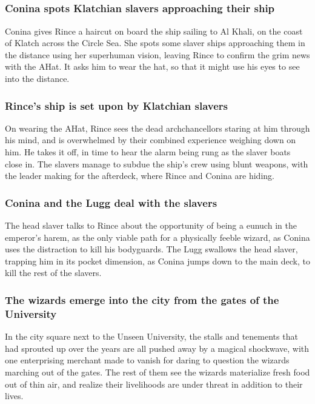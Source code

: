 \subsection{}
\subsubsection{\Gls{Conina} spots Klatchian slavers approaching their ship}
\Gls{Conina} gives \Gls{Rince} a haircut on board the ship sailing to Al Khali, on the coast of
Klatch across the Circle Sea. She spots some slaver ships approaching them in the distance using
her superhuman vision, leaving \Gls{Rince} to confirm the grim news with the \Gls{AHat}. It asks
him to wear the hat, so that it might use his eyes to see into the distance.

\subsubsection{\Gls{Rince}'s ship is set upon by Klatchian slavers}
On wearing the \Gls{AHat}, \Gls{Rince} sees the dead archchancellors staring at him through his
mind, and is overwhelmed by their combined experience weighing down on him. He takes it off, in
time to hear the alarm being rung as the slaver boats close in. The slavers manage to subdue the
ship's crew using blunt weapons, with the leader making for the afterdeck, where \Gls{Rince}
and \Gls{Conina} are hiding.

\subsubsection{\Gls{Conina} and the \Gls{Lugg} deal with the slavers}
The head slaver talks to \Gls{Rince} about the opportunity of being a eunuch in the emperor's
harem, as the only viable path for a physically feeble wizard, as \Gls{Conina} uses the distraction
to kill his bodyguards. The \Gls{Lugg} swallows the head slaver, trapping him in its pocket
dimension, as \Gls{Conina} jumps down to the main deck, to kill the rest of the slavers.

\subsubsection{The wizards emerge into the city from the gates of the University}
In the city square next to the Unseen University, the stalls and tenements that had sprouted up
over the years are all pushed away by a magical shockwave, with one enterprising merchant made to
vanish for daring to question the wizards marching out of the gates. The rest of them see the
wizards materialize fresh food out of thin air, and realize their livelihoods are under threat in
addition to their lives.

